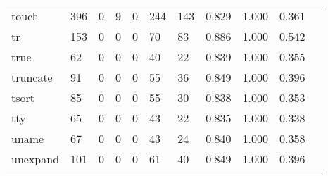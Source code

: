 \begin{longtable}{lp{1.10cm}p{1.10cm}p{1.10cm}p{1.10cm}p{1.10cm}p{1.10cm}p{1.10cm}p{1.10cm}p{1.10cm}p{1.10cm}}
touch     &                    396 &                                  0 &                                 9 &                                0 &                               244 &                             143 &                          0.829 &                                 1.000 &                               0.361 \\
tr        &                    153 &                                  0 &                                 0 &                                0 &                                70 &                              83 &                          0.886 &                                 1.000 &                               0.542 \\
true      &                     62 &                                  0 &                                 0 &                                0 &                                40 &                              22 &                          0.839 &                                 1.000 &                               0.355 \\
truncate  &                     91 &                                  0 &                                 0 &                                0 &                                55 &                              36 &                          0.849 &                                 1.000 &                               0.396 \\
tsort     &                     85 &                                  0 &                                 0 &                                0 &                                55 &                              30 &                          0.838 &                                 1.000 &                               0.353 \\
tty       &                     65 &                                  0 &                                 0 &                                0 &                                43 &                              22 &                          0.835 &                                 1.000 &                               0.338 \\
uname     &                     67 &                                  0 &                                 0 &                                0 &                                43 &                              24 &                          0.840 &                                 1.000 &                               0.358 \\
unexpand  &                    101 &                                  0 &                                 0 &                                0 &                                61 &                              40 &                          0.849 &                                 1.000 &                               0.396 \\

\end{longtable}
